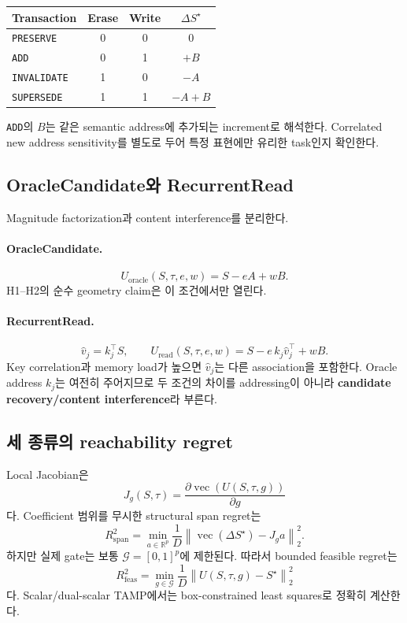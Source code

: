 \documentclass[10.5pt,a4paper]{article}
\newcommand{\R}{\mathbb{R}}
\newcommand{\vect}[1]{\operatorname{vec}(#1)}
\newcommand{\op}[1]{\texttt{#1}}
\begin{document}
\begin{center}
\begin{tabular}{lccc}
\toprule
Transaction & Erase & Write & $\Delta S^\star$ \\
\midrule
\op{PRESERVE} & 0 & 0 & $0$ \\
\op{ADD} & 0 & 1 & $+B$ \\
\op{INVALIDATE} & 1 & 0 & $-A$ \\
\op{SUPERSEDE} & 1 & 1 & $-A+B$ \\
\bottomrule
\end{tabular}
\end{center}

\op{ADD}의 $B$는 같은 semantic address에 추가되는 increment로 해석한다. Correlated new address sensitivity를 별도로 두어 특정 표현에만 유리한 task인지 확인한다.

\subsection{OracleCandidate와 RecurrentRead}
Magnitude factorization과 content interference를 분리한다.

\paragraph{OracleCandidate.}
\[
U_{\mathrm{oracle}}(S,\tau,e,w)=S-eA+wB.
\]
H1--H2의 순수 geometry claim은 이 조건에서만 열린다.

\paragraph{RecurrentRead.}
\[
\widehat v_j=k_j^\top S,\qquad
U_{\mathrm{read}}(S,\tau,e,w)=S-e\,k_j\widehat v_j^\top+wB.
\]
Key correlation과 memory load가 높으면 $\widehat v_j$는 다른 association을 포함한다. Oracle address $k_j$는 여전히 주어지므로 두 조건의 차이를 addressing이 아니라 \textbf{candidate recovery/content interference}라 부른다.

\subsection{세 종류의 reachability regret}
Local Jacobian은
\[
J_g(S,\tau)=\frac{\partial\vect{U(S,\tau,g)}}{\partial g}
\]
다. Coefficient 범위를 무시한 structural span regret는
\[
R_{\mathrm{span}}^2=
\min_{a\in\R^p}\frac{1}{D}
\left\|\vect{\Delta S^\star}-J_ga\right\|_2^2.
\]
하지만 실제 gate는 보통 $\mathcal G=[0,1]^p$에 제한된다. 따라서 bounded feasible regret는
\[
R_{\mathrm{feas}}^2=
\min_{g\in\mathcal G}\frac{1}{D}
\left\|U(S,\tau,g)-S^\star\right\|_2^2
\]
다. Scalar/dual-scalar TAMP에서는 box-constrained least squares로 정확히 계산한다.
\end{document}
